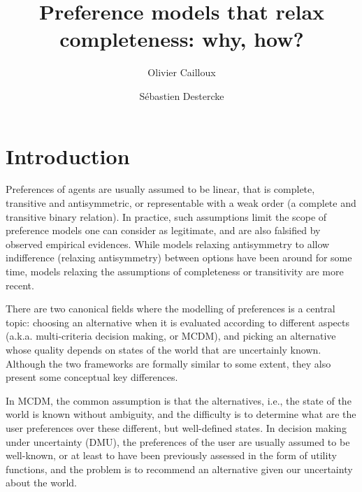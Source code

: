 \documentclass[french, english]{llncs}
\begin{document}
	\title{Preference models that relax completeness: why, how?}
	\author{Olivier Cailloux \and Sébastien Destercke}
	\maketitle
	
	
	\setlength{\parindent}{1.5em}
	
	\section{Introduction}\label{sec:intro}
	Preferences of agents are usually assumed to be linear, that is complete, transitive and antisymmetric, or representable with a weak order (a complete and transitive binary relation). In practice, such assumptions limit the scope of preference models one can consider as legitimate, and are also falsified by observed empirical evidences. While models relaxing antisymmetry to allow indifference (relaxing antisymmetry) between options have been around for some time, models relaxing the assumptions of completeness or transitivity are more recent.
	
	There are two canonical fields where the modelling of preferences is a central topic: choosing an alternative when it is evaluated according to different aspects (a.k.a. multi-criteria decision making, or MCDM), and picking an alternative whose quality depends on states of the world that are uncertainly known. Although the two frameworks are formally similar to some extent, they also present some conceptual key differences. 
	
	In MCDM, the common assumption is that the alternatives, i.e., the state of the world is known without ambiguity, and the difficulty is to determine what are the user preferences over these different, but well-defined states. In decision making under uncertainty (DMU), the preferences of the user are usually assumed to be well-known, or at least to have been previously assessed in the form of utility functions, and the problem is to recommend an alternative given our uncertainty about the world. 
	
\end{document}
